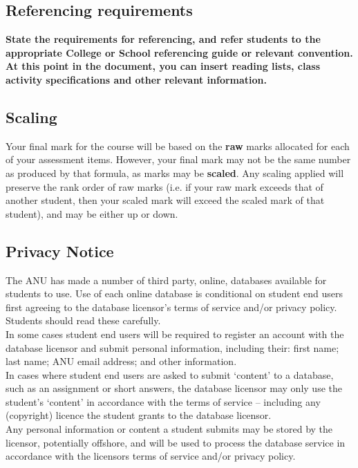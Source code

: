 \documentclass[11pt]{article}
\begin{document}
\subsection*{Referencing requirements}
{\bfseries\color{red}State the requirements for referencing, and refer students to the appropriate College or School referencing guide or relevant convention.} \\

{\bfseries\color{red}At this point in the document, you can insert reading lists, class activity specifications and other relevant information.}

\subsection*{Scaling}
Your final mark for the course will be based on the \textbf{raw} marks allocated for each of your assessment items. However, your final mark may not be the same number as produced by that formula, as marks may be \textbf{scaled}. Any scaling applied will preserve the rank order of raw marks (i.e. if your raw mark exceeds that of another student, then your scaled mark will exceed the scaled mark of that student), and may be either up or down.

\subsection*{Privacy Notice}
The ANU has made a number of third party, online, databases available for students to use. Use of each online database is conditional on student end users first agreeing to the database licensor’s terms of service and/or privacy policy. Students should read these carefully. \\

In some cases student end users will be required to register an account with the database licensor and submit personal information, including their: first name; last name; ANU email address; and other information. \\

In cases where student end users are asked to submit ‘content’ to a database, such as an assignment or short answers, the database licensor may only use the student’s ‘content’ in accordance with the terms of service – including any (copyright) licence the student grants to the database licensor. \\

Any personal information or content a student submits may be stored by the licensor, potentially offshore, and will be used to process the database service in accordance with the licensors terms of service and/or privacy policy. \\
\end{document}
